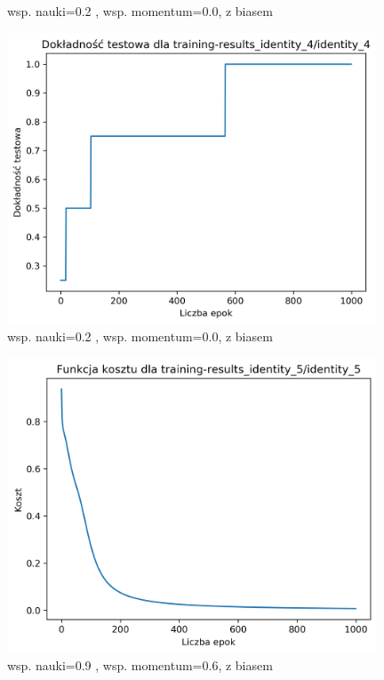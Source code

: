 \documentclass{classrep}
\begin{document}
{{\begin{figure}[!htbp]
                \caption{wsp. nauki=0.2 , wsp. momentum=0.0, z biasem}
            \end{figure}
            \begin{figure}[!htbp]
                \centering
                \includegraphics[width=110mm]{wykresy/identity_4_testing-accuracy.png}
                \caption{wsp. nauki=0.2 , wsp. momentum=0.0, z biasem}
            \end{figure}
            \FloatBarrier
            \begin{figure}[!htbp]
                \centering
                \includegraphics[width=110mm]{wykresy/identity_5_cost.png}
                \caption{wsp. nauki=0.9 , wsp. momentum=0.6, z biasem}
            \end{figure}
            \begin{figure}[!htbp]
                \centering

\end{figure}}}
\end{document}
